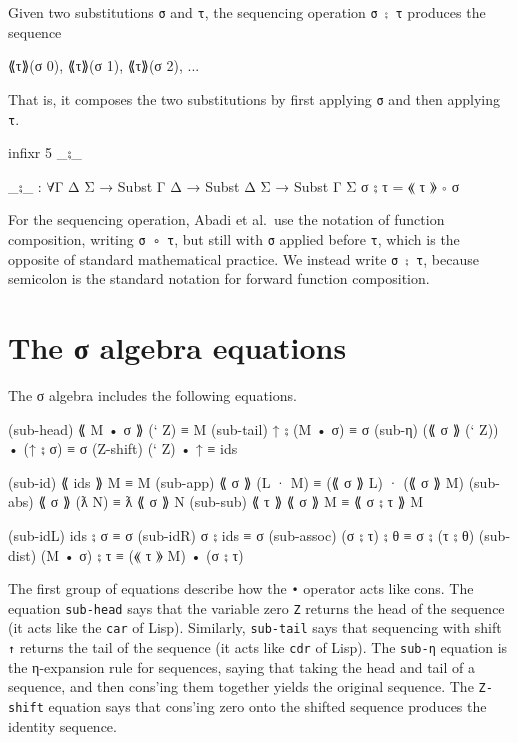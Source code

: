 Given two substitutions \texttt{σ} and \texttt{τ}, the sequencing
operation \texttt{σ\ ⨟\ τ} produces the sequence

\begin{myDisplay}
⟪τ⟫(σ 0), ⟪τ⟫(σ 1), ⟪τ⟫(σ 2), ...
\end{myDisplay}

That is, it composes the two substitutions by first applying \texttt{σ}
and then applying \texttt{τ}.

\begin{fence}
\begin{code}
infixr 5 _⨟_

_⨟_ : ∀{Γ Δ Σ} → Subst Γ Δ → Subst Δ Σ → Subst Γ Σ
σ ⨟ τ = ⟪ τ ⟫ ∘ σ
\end{code}
\end{fence}

For the sequencing operation, Abadi et al.~use the notation of function
composition, writing \texttt{σ\ ∘\ τ}, but still with \texttt{σ} applied
before \texttt{τ}, which is the opposite of standard mathematical
practice. We instead write \texttt{σ\ ⨟\ τ}, because semicolon is the
standard notation for forward function composition.

\hypertarget{the-ux3c3-algebra-equations}{%
\section{The σ algebra equations}\label{the-ux3c3-algebra-equations}}

The σ algebra includes the following equations.

\begin{myDisplay}
(sub-head)  ⟪ M • σ ⟫ (` Z) ≡ M
(sub-tail)  ↑ ⨟ (M • σ)    ≡ σ
(sub-η)     (⟪ σ ⟫ (` Z)) • (↑ ⨟ σ) ≡ σ
(Z-shift)   (` Z) • ↑      ≡ ids

(sub-id)    ⟪ ids ⟫ M      ≡ M
(sub-app)   ⟪ σ ⟫ (L · M)  ≡ (⟪ σ ⟫ L) · (⟪ σ ⟫ M)
(sub-abs)   ⟪ σ ⟫ (ƛ N)    ≡ ƛ ⟪ σ ⟫ N
(sub-sub)   ⟪ τ ⟫ ⟪ σ ⟫ M  ≡ ⟪ σ ⨟ τ ⟫ M

(sub-idL)   ids ⨟ σ        ≡ σ
(sub-idR)   σ ⨟ ids        ≡ σ
(sub-assoc) (σ ⨟ τ) ⨟ θ    ≡ σ ⨟ (τ ⨟ θ)
(sub-dist)  (M • σ) ⨟ τ    ≡ (⟪ τ ⟫ M) • (σ ⨟ τ)
\end{myDisplay}

The first group of equations describe how the \texttt{•} operator acts
like cons. The equation \texttt{sub-head} says that the variable zero
\texttt{Z} returns the head of the sequence (it acts like the
\texttt{car} of Lisp). Similarly, \texttt{sub-tail} says that sequencing
with shift \texttt{↑} returns the tail of the sequence (it acts like
\texttt{cdr} of Lisp). The \texttt{sub-η} equation is the η-expansion
rule for sequences, saying that taking the head and tail of a sequence,
and then cons'ing them together yields the original sequence. The
\texttt{Z-shift} equation says that cons'ing zero onto the shifted
sequence produces the identity sequence.

